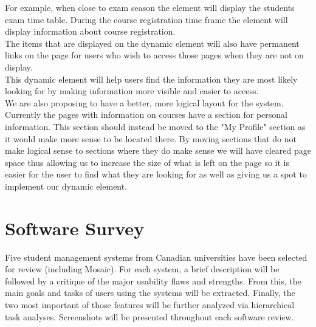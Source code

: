 \documentclass[10pt]{article}
\begin{document}
\begin{multicols}{2}
For example, when close to exam season the element will display the students exam time table. During the course registration time frame the element will display information about course registration.\\

The items that are displayed on the dynamic element will also have permanent links on the page for users who wish to access those pages when they are not on display. \\

This dynamic element will help users find the information they are most likely looking for by making information more visible and easier to access. \\

We are also proposing to have a better, more logical layout for the system. Currently the pages with information on courses have a section for personal information. This section should instead be moved to the "My Profile" section as it would make more sense to be located there. By moving sections that do not make logical sense to sections where they do make sense we will have cleared page space thus allowing us to increase the size of what is left on the page so it is easier for the user to find what they are looking for as well as giving us a spot to implement our dynamic element. 

\section*{Software Survey}
Five student management systems from Canadian universities have been selected for review (including Mosaic). For each system, a brief description will be followed by a critique of the major usability flaws and strengths. From this, the main goals and tasks of users using the systems will be extracted. Finally, the two most important of those features will be further analyzed via hierarchical task analyses. Screenshots will be presented throughout each software review.


\end{multicols}
\end{document}
